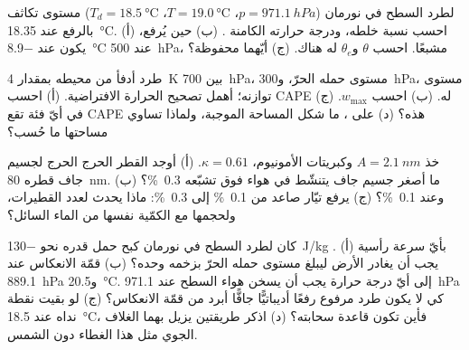 \begin{exercise}[$\star\star$]\label{exo:b2:atmospheric-thermodynamics:7}
لطرد السطح في نورمان ($p = \qty{971.1}{hPa}$، $T = \qty{19.0}{\celsius}$، $T_d =
\qty{18.5}{\celsius}$) مستوى تكاثف بالرفع عند \qty{18.35}{\celsius}. (أ) احسب نسبة خلطه،
ودرجة حرارته الكامنة . (ب) حين يُرفع، يكون عند
\qty{-8.9}{\celsius} عند \qty{500}{hPa}، مشبعًا. احسب $\theta$ و$\theta_e$ له هناك.
(ج) أيّهما محفوظة؟
\end{exercise}

\begin{exercise}[$\star\star$]\label{exo:b2:atmospheric-thermodynamics:8}
طرد أدفأ من محيطه بمقدار \qty{4}{K} بين \qty{700}{hPa}، مستوى حمله الحرّ،
و\qty{300}{hPa}، مستوى توازنه؛ أهمل تصحيح الحرارة الافتراضية. (أ) احسب CAPE له. (ب)
احسب $w_{\max}$. (ج) في أيّ فئة تقع CAPE هذه؟ (د) على ، ما
شكل المساحة الموجبة، ولماذا تساوي مساحتها ما حُسب؟
\end{exercise}

\begin{exercise}[$\star\star$]\label{exo:b2:atmospheric-thermodynamics:9}
خذ $A = \qty{2.1}{nm}$ وكبريتات الأمونيوم، $\kappa = 0.61$. (أ) أوجد القطر الحرج
 الحرج لجسيم جاف قطره \qty{80}{nm}. (ب) ما أصغر جسيم جاف
يتنشّط في هواء فوق تشبّعه \qty{0.3}{\percent}؟ وعند \qty{0.1}{\percent}؟ (ج) يرفع تيّار صاعد
 من \qty{0.1}{\percent} إلى \qty{0.3}{\percent}: ماذا يحدث
لعدد القطيرات، ولحجمها مع الكمّية نفسها من الماء السائل؟
\end{exercise}

\begin{exercise}[$\star\star\star$]\label{exo:b2:atmospheric-thermodynamics:10}
كان لطرد السطح في نورمان كبح حمل قدره نحو \qty{-130}{J/kg} .
(أ) بأيّ سرعة رأسية يجب أن يغادر الأرض ليبلغ مستوى حمله الحرّ بزخمه
وحده؟ (ب) قمّة الانعكاس عند \qty{889.1}{hPa} و\qty{20.5}{\celsius}. إلى أيّ
درجة حرارة يجب أن يسخن هواء السطح عند \qty{971.1}{hPa} كي لا يكون طرد مرفوع رفعًا أديباتيًّا
جافًّا أبرد من قمّة الانعكاس؟ (ج) لو بقيت نقطة نداه عند
\qty{18.5}{\celsius}، فأين تكون قاعدة سحابته؟ (د) اذكر طريقتين يزيل بهما الغلاف الجوي
مثل هذا الغطاء دون الشمس.
\end{exercise}

